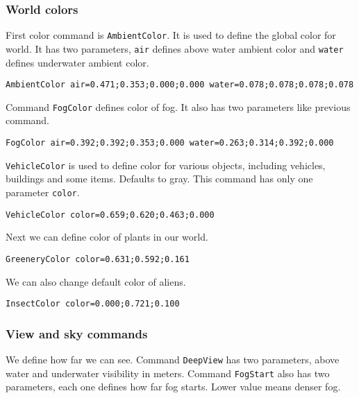

\subsubsection{World colors}

First color command is \verb|AmbientColor|. It is used to define the global color for world. It has two parameters, \verb|air| defines above water ambient color and \verb|water| defines underwater ambient color.

\begin{verbatim}
AmbientColor air=0.471;0.353;0.000;0.000 water=0.078;0.078;0.078;0.078
\end{verbatim}


Command \verb|FogColor| defines color of fog. It also has two parameters like previous command.

\begin{verbatim}
FogColor air=0.392;0.392;0.353;0.000 water=0.263;0.314;0.392;0.000
\end{verbatim}

\verb|VehicleColor| is used to define color for various objects, including vehicles, buildings and some items. Defaults to gray. This command has only one parameter \verb|color|.

\begin{verbatim}
VehicleColor color=0.659;0.620;0.463;0.000
\end{verbatim}

Next we can define color of plants in our world.

\begin{verbatim}
GreeneryColor color=0.631;0.592;0.161
\end{verbatim}

We can also change default color of aliens.

\begin{verbatim}
InsectColor color=0.000;0.721;0.100
\end{verbatim}


\subsubsection{View and sky commands}

We define how far we can see. Command \texttt{DeepView} has two parameters, above water and underwater visibility in meters. Command \texttt{FogStart} also has two parameters, each one defines how far fog starts. Lower value means denser fog.


